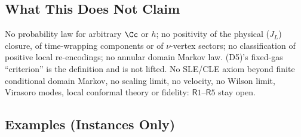 \subsection{What This Does Not Claim}

No probability law for arbitrary \(\Cc\) or \(h\); no positivity of the physical (\(J_L\)) closure, of time-wrapping components or of
\(\nu\)-vertex sectors; no classification of positive local re-encodings; no annular domain Markov law. (D5)'s fixed-gas ``criterion''
is the definition and is not lifted. No SLE/CLE axiom beyond finite conditional domain Markov, no scaling limit, no velocity, no
Wilson limit, Virasoro modes, local conformal theory or fidelity: \(\mathsf R1\)--\(\mathsf R5\) stay open.

\subsection{Examples (Instances Only)}

